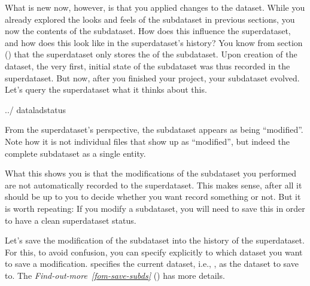 \sphinxAtStartPar
What is new now, however, is that you applied changes to the dataset. While
you already explored the looks and feels of the  subdataset in
previous sections, you now  the contents of the 
subdataset.
How does this influence the superdataset, and how does this look like in the
superdataset’s history? You know from section {\hyperref[\detokenize{basics/101-106-nesting:nesting}]{}} () that the
superdataset only stores the  of the subdataset. Upon creation of the
dataset, the very first, initial state of the subdataset was thus recorded in
the superdataset. But now, after you finished your project, your subdataset
evolved. Let’s query the superdataset what it thinks about this.

\begin{sphinxVerbatim}[commandchars=\\\{\}]
../
dataladstatus
\end{sphinxVerbatim}

\sphinxAtStartPar
From the superdataset’s perspective, the subdataset appears as being
“modified”. Note how it is not individual files that show up as “modified”, but
indeed the complete subdataset as a single entity.

\sphinxAtStartPar
What this shows you is that the modifications of the subdataset you performed are not
automatically recorded to the superdataset. This makes sense, after all it
should be up to you to decide whether you want record something or not.
But it is worth repeating: If you modify a subdataset, you will need to save
this  in order to have a clean superdataset status.

\sphinxAtStartPar
Let’s save the modification of the subdataset into the history of the
superdataset. For this, to avoid confusion, you can specify explicitly to
which dataset you want to save a modification.  specifies the current
dataset, i.e., , as the dataset to save to.
The \textit{Find-out-more}~{\findoutmoreiconinline}\textit{\ref{fom-save-subds}} {\hyperref[\detokenize{basics/101-132-advancednesting:fom-save-subds}]{}} () has more details.

